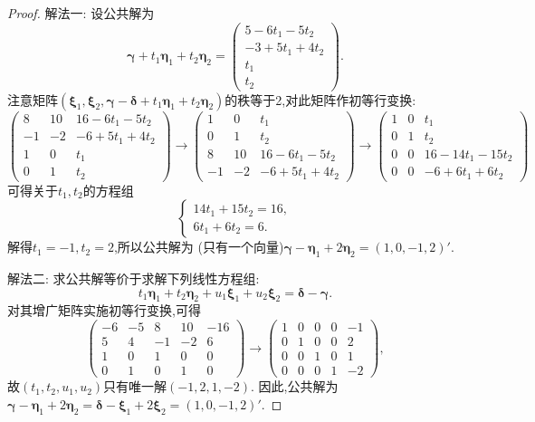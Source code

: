 \documentclass[lang=cn,newtx,10pt,scheme=chinese]{elegantbook}
\begin{document}
\begin{proof}
{\color{blue}解法一:} 设公共解为
\[
\boldsymbol{\gamma}+t_1\boldsymbol{\eta}_1 + t_2\boldsymbol{\eta}_2=\begin{pmatrix}
5 - 6t_1 - 5t_2\\
-3 + 5t_1 + 4t_2\\
t_1\\
t_2
\end{pmatrix}.
\]
注意矩阵\((\boldsymbol{\xi}_1,\boldsymbol{\xi}_2,\boldsymbol{\gamma}-\boldsymbol{\delta}+t_1\boldsymbol{\eta}_1 + t_2\boldsymbol{\eta}_2)\)的秩等于2,对此矩阵作初等行变换:
\[
\begin{pmatrix}
8&10&16 - 6t_1 - 5t_2\\
-1&-2&-6 + 5t_1 + 4t_2\\
1&0&t_1\\
0&1&t_2
\end{pmatrix}\to\begin{pmatrix}
1&0&t_1\\
0&1&t_2\\
8&10&16 - 6t_1 - 5t_2\\
-1&-2&-6 + 5t_1 + 4t_2
\end{pmatrix}\to
\begin{pmatrix}
1&0&t_1\\
0&1&t_2\\
0&0&16 - 14t_1 - 15t_2\\
0&0&-6 + 6t_1 + 6t_2
\end{pmatrix}
\]
可得关于\(t_1,t_2\)的方程组
\[
\begin{cases}
14t_1 + 15t_2 = 16,\\
6t_1 + 6t_2 = 6.
\end{cases}
\]
解得\(t_1=-1,t_2 = 2\),所以公共解为 (只有一个向量)\(\boldsymbol{\gamma}-\boldsymbol{\eta}_1 + 2\boldsymbol{\eta}_2=(1,0,-1,2)'\).

{\color{blue}解法二:} 求公共解等价于求解下列线性方程组:
\[
t_1\boldsymbol{\eta}_1 + t_2\boldsymbol{\eta}_2 + u_1\boldsymbol{\xi}_1 + u_2\boldsymbol{\xi}_2=\boldsymbol{\delta}-\boldsymbol{\gamma}.
\]
对其增广矩阵实施初等行变换,可得
\[
\begin{pmatrix}
-6&-5&8&10&-16\\
5&4&-1&-2&6\\
1&0&1&0&0\\
0&1&0&1&0
\end{pmatrix}\to\begin{pmatrix}
1&0&0&0&-1\\
0&1&0&0&2\\
0&0&1&0&1\\
0&0&0&1&-2
\end{pmatrix},
\]
故\((t_1,t_2,u_1,u_2)\)只有唯一解\((-1,2,1,-2)\). 因此,公共解为\(\boldsymbol{\gamma}-\boldsymbol{\eta}_1 + 2\boldsymbol{\eta}_2=\boldsymbol{\delta}-\boldsymbol{\xi}_1 + 2\boldsymbol{\xi}_2=(1,0,-1,2)'\).
\end{proof}
\end{document}

